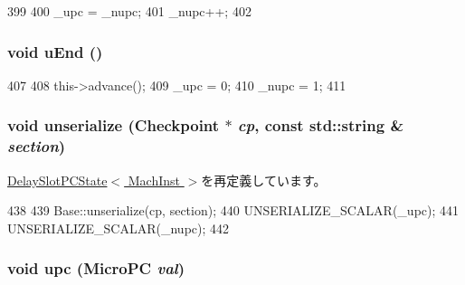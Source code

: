 \begin{DoxyCode}
399     {
400         _upc = _nupc;
401         _nupc++;
402     }
\end{DoxyCode}
\hypertarget{classGenericISA_1_1DelaySlotUPCState_a2f3cdfc88ed61928bd28242996e0f86e}{
\subsubsection[{uEnd}]{\setlength{\rightskip}{0pt plus 5cm}void uEnd ()}}
\label{classGenericISA_1_1DelaySlotUPCState_a2f3cdfc88ed61928bd28242996e0f86e}



\begin{DoxyCode}
407     {
408         this->advance();
409         _upc = 0;
410         _nupc = 1;
411     }
\end{DoxyCode}
\hypertarget{classGenericISA_1_1DelaySlotUPCState_af22e5d6d660b97db37003ac61ac4ee49}{
\subsubsection[{unserialize}]{\setlength{\rightskip}{0pt plus 5cm}void unserialize ({\bf Checkpoint} $\ast$ {\em cp}, \/  const std::string \& {\em section})}}
\label{classGenericISA_1_1DelaySlotUPCState_af22e5d6d660b97db37003ac61ac4ee49}


\hyperlink{classGenericISA_1_1DelaySlotPCState_af22e5d6d660b97db37003ac61ac4ee49}{DelaySlotPCState$<$ MachInst $>$}を再定義しています。


\begin{DoxyCode}
438     {
439         Base::unserialize(cp, section);
440         UNSERIALIZE_SCALAR(_upc);
441         UNSERIALIZE_SCALAR(_nupc);
442     }
\end{DoxyCode}
\hypertarget{classGenericISA_1_1DelaySlotUPCState_ae13f8fb6bc07c4a7ac4af3496277000c}{
\subsubsection[{upc}]{\setlength{\rightskip}{0pt plus 5cm}void upc ({\bf MicroPC} {\em val})}}
\label{classGenericISA_1_1DelaySlotUPCState_ae13f8fb6bc07c4a7ac4af3496277000c}



